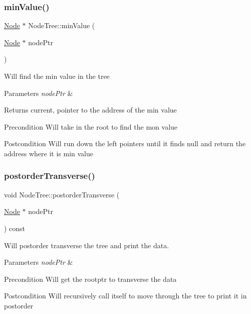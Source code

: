 \subsubsection{\texorpdfstring{min\+Value()}{minValue()}}
{\footnotesize\ttfamily \mbox{\hyperlink{class_node}{Node}} $\ast$ Node\+Tree\+::min\+Value (\begin{DoxyParamCaption}\item[{\mbox{\hyperlink{class_node}{Node}} $\ast$}]{node\+Ptr }\end{DoxyParamCaption})}

Will find the min value in the tree 
\begin{DoxyParams}{Parameters}
{\em node\+Ptr} & \\
\hline
\end{DoxyParams}
\begin{DoxyReturn}{Returns}
current, pointer to the address of the min value 
\end{DoxyReturn}
\begin{DoxyPrecond}{Precondition}
Will take in the root to find the mon value 
\end{DoxyPrecond}
\begin{DoxyPostcond}{Postcondition}
Will run down the left pointers until it finds null and return the address where it is min value 
\end{DoxyPostcond}
\mbox{\label{class_node_tree_a09ddf9e2cb245c50952b9669fb328907}} 
\subsubsection{\texorpdfstring{postorder\+Transverse()}{postorderTransverse()}}
{\footnotesize\ttfamily void Node\+Tree\+::postorder\+Transverse (\begin{DoxyParamCaption}\item[{\mbox{\hyperlink{class_node}{Node}} $\ast$}]{node\+Ptr }\end{DoxyParamCaption}) const}



Will postorder transverse the tree and print the data. 


\begin{DoxyParams}{Parameters}
{\em node\+Ptr} & \\
\hline
\end{DoxyParams}
\begin{DoxyPrecond}{Precondition}
Will get the rootptr to transverse the data 
\end{DoxyPrecond}
\begin{DoxyPostcond}{Postcondition}
Will recursively call itself to move through the tree to print it in postorder 
\end{DoxyPostcond}
\mbox{\label{class_node_tree_a73bd5a18b76a3741fcf49e0465622de2}} 
